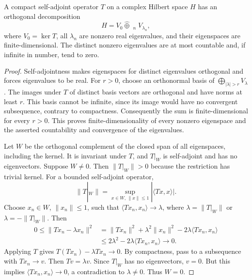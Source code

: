 \begin{lemma}
A compact self-adjoint operator $T$ on a complex Hilbert space $H$ has
an orthogonal decomposition
\[
 H=V_0\mathbin{\widehat\oplus}\mathop{\widehat\bigoplus}_{n}V_{\lambda_n},
\]
where $V_0=\ker T$, all $\lambda_n$ are nonzero real eigenvalues, and their
eigenspaces are finite-dimensional. The distinct nonzero eigenvalues are
at most countable and, if infinite in number, tend to zero.
\end{lemma}
\begin{proof}
Self-adjointness makes eigenspaces for distinct eigenvalues orthogonal and
forces eigenvalues to be real. For $r>0$, choose an orthonormal basis of
$\bigoplus_{|\lambda|>r}V_\lambda$. The images under $T$ of distinct basis
vectors are orthogonal and have norms at least $r$. This basis cannot be
infinite, since its image would have no convergent subsequence, contrary
to compactness. Consequently the sum is finite-dimensional for every
$r>0$. This proves finite-dimensionality of every nonzero eigenspace and
the asserted countability and convergence of the eigenvalues.

Let $W$ be the orthogonal complement of the closed span of all eigenspaces,
including the kernel. It is invariant under $T$, and $T|_W$ is self-adjoint
and has no eigenvectors. Suppose $W\ne0$. Then $\|T|_W\|>0$ because the
restriction has trivial kernel. For a bounded self-adjoint operator,
\[
 \|T|_W\|=\sup_{x\in W,\,\|x\|\leq1}|\langle Tx,x\rangle|.
\]
Choose $x_n\in W$, $\|x_n\|\leq1$, such that
$\langle Tx_n,x_n\rangle\to\lambda$, where
$\lambda=\|T|_W\|$ or $\lambda=-\|T|_W\|$. Then
\[
\begin{split}
 0\leq\|Tx_n-\lambda x_n\|^2
 &=\|Tx_n\|^2+\lambda^2\|x_n\|^2
       -2\lambda\langle Tx_n,x_n\rangle\\
 &\leq 2\lambda^2-2\lambda\langle Tx_n,x_n\rangle\longrightarrow0.
\end{split}
\]
Applying $T$ gives $T(Tx_n)-\lambda Tx_n\to0$. By compactness, pass to a
subsequence with $Tx_n\to v$. Then $Tv=\lambda v$. Since $T|_W$ has no
eigenvectors, $v=0$. But this implies
$\langle Tx_n,x_n\rangle\to0$, a contradiction to $\lambda\ne0$.
Thus $W=0$.
\end{proof}

